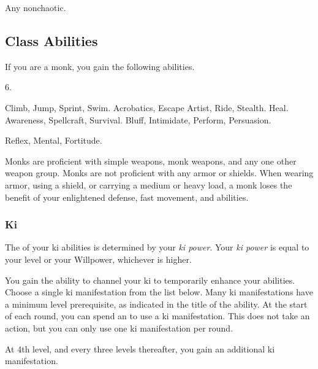      Any nonchaotic.

    \subsection{Class Abilities}
        If you are a monk, you gain the following abilities.

         6.

         Climb, Jump, Sprint, Swim.
         Acrobatics, Escape Artist, Ride, Stealth.
         Heal.
         Awareness, Spellcraft, Survival.
         Bluff, Intimidate, Perform, Persuasion.

          Reflex,  Mental,  Fortitude.

        Monks are proficient with simple weapons, monk weapons, and any one other weapon group.
        Monks are not proficient with any armor or shields.
        When wearing armor, using a shield, or carrying a medium or heavy load, a monk loses the benefit of your enlightened defense, fast movement, and \ki abilities.


        \subsubsection{Ki}
            The  of your ki abilities is determined by your \textit{ki power}.
            Your \textit{ki power} is equal to your level or your Willpower, whichever is higher.

            You gain the ability to channel your ki to temporarily enhance your abilities.
            Choose a single ki manifestation from the list below.
            Many ki manifestations have a minimum level prerequisite, as indicated in the title of the ability.
            At the start of each round, you can spend an  to use a ki manifestation.
            This does not take an action, but you can only use one ki manifestation per round.

            At 4th level, and every three levels thereafter, you gain an additional ki manifestation.

